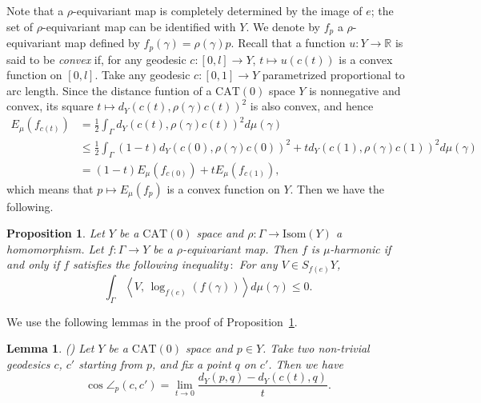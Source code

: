 \documentclass[12pt]{amsart}
\numberwithin{equation}{section}
\theoremstyle{plain}
\newtheorem{Proposition}[Theorem]{Proposition}
\newtheorem{Lemma}[Theorem]{Lemma}
\theoremstyle{definition}
\theoremstyle{remark}
\newcommand{\R}{{\mathbb R}}
\newcommand{\tcprj}{\log}
\newcommand{\ene}[1]{E_{#1}}
\newcommand{\inner}[2]{\left\langle #1,\, #2 \right\rangle}
\newcommand{\isom}[1]{\mathrm{Isom}({#1})}
\newcommand{\cat}[1]{\mathrm{CAT}(#1)}
\begin{document}
Note that a $\rho$-equivariant map is completely determined by the image
of $e$; the set of $\rho$-equivariant map can be identified with $Y$. 
We denote by $f_p$ a $\rho$-equivariant map defined by 
$f_p(\gamma)=\rho(\gamma)p$. 
Recall that a function $u \colon Y \rightarrow \R$ is said to be
{\it convex} if, for any geodesic $c\colon [0,l]\rightarrow Y$, 
$t \mapsto u(c(t))$ is a convex function on $[0,l]$. 
Take any geodesic $c \colon [0,1]\rightarrow Y$ parametrized
proportional to arc length. 
Since the distance funtion of a $\cat{0}$ space $Y$ is nonnegative and
convex, its square $t \mapsto d_Y(c(t),\rho(\gamma)c(t))^2$ is also
convex, and hence
\begin{equation*}
\begin{split}
   \ene{\mu}(f_{c(t)}) 
 & =\frac{1}{2} \int_{\Gamma} d_Y(c(t),\rho(\gamma)c(t))^2 d\mu(\gamma) \\
 & \leq \frac{1}{2}\int_{\Gamma} (1-t)d_Y(c(0),\rho(\gamma)c(0))^2
  + t d_Y(c(1),\rho(\gamma)c(1))^2 d\mu(\gamma) \\
 & = (1-t)\ene{\mu}(f_{c(0)}) + t \ene{\mu}(f_{c(1)}), 
\end{split}
\end{equation*}
which means that $p\mapsto \ene{\mu}(f_p)$ is a convex function on
$Y$.  Then we have the following. 

\begin{Proposition}
 \label{prop:first_variation}
 Let $Y$ be a $\cat{0}$ space and 
 $\rho\colon \Gamma\rightarrow \isom{Y}$ a homomorphism. 
 Let $f\colon \Gamma \rightarrow Y$ be a $\rho$-equivariant map. 
 Then $f$ is $\mu$-harmonic if and only if $f$ satisfies the following
 inequality$\,:$ For any $V \in S_{f(e)}Y$, 
\begin{equation}
 \label{eq:first_variation}
 \int_{\Gamma} \inner{V}{\tcprj_{f(e)}(f(\gamma))} d\mu(\gamma)\leq 0. 
\end{equation}
\end{Proposition}

We use the following lemmas in the proof of 
Proposition~\ref{prop:first_variation}. 


\begin{Lemma}{{\rm (\cite[p.~185, 3.6 Corollary]{bridson-haefliger})}}
\label{lem:angle}
 Let $Y$ be a $\cat{0}$ space and $p \in Y$. Take two non-trivial
 geodesics $c$, $c'$ starting
 from $p$, and fix a point $q$ on $c'$.  Then we have
\begin{equation*}
  \cos \angle_p (c,c') = \lim_{t \rightarrow 0} 
 \frac{d_Y(p,q) - d_Y(c(t),q)}{t}.
\end{equation*}
\end{Lemma}
\end{document}
